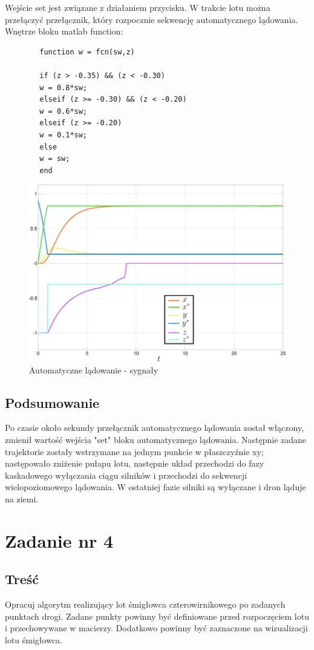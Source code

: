 \documentclass[polish,11pt,a4paper]{article}
\begin{document}
Wejście set jest związane z działaniem przycisku. W trakcie lotu można przełączyć przełącznik, który rozpocznie
sekwencję automatycznego lądowania. Wnętrze bloku matlab function:
\begin{footnotesize}
	\begin{verbatim}
		function w = fcn(sw,z)
		
		if (z > -0.35) && (z < -0.30)
		w = 0.8*sw;
		elseif (z >= -0.30) && (z < -0.20)
		w = 0.6*sw;
		elseif (z >= -0.20)
		w = 0.1*sw;
		else
		w = sw;
		end
	\end{verbatim}
\end{footnotesize}
\begin{figure}[H]
	\centering
	\includegraphics[width=\linewidth]{lądowanie/land.png}
	\caption{Automatyczne lądowanie - sygnały}
\end{figure}
\subsection*{Podsumowanie}
Po czasie około sekundy przełącznik automatycznego lądowania został włączony, zmienił wartość wejścia "set" bloku automatycznego
lądowania. Następnie zadane trajektorie zostały wstrzymane na jednym punkcie w płaszczyźnie xy; następowało 
zniżenie pułapu lotu, następnie układ przechodzi do fazy kaskadowego wyłączania ciągu silników i przechodzi
do sekwencji wielopoziomowego lądowania. W ostatniej fazie silniki są wyłączane i dron ląduje na ziemi.
\section*{Zadanie nr 4}
\subsection*{Treść}
Opracuj algorytm realizujący lot śmigłowca czterowirnikowego po zadanych punktach drogi.
Zadane punkty powinny być definiowane przed rozpoczęciem lotu i przechowywane w 
macierzy. Dodatkowo powinny być zaznaczone na wizualizacji lotu śmigłowca.
\end{document}
